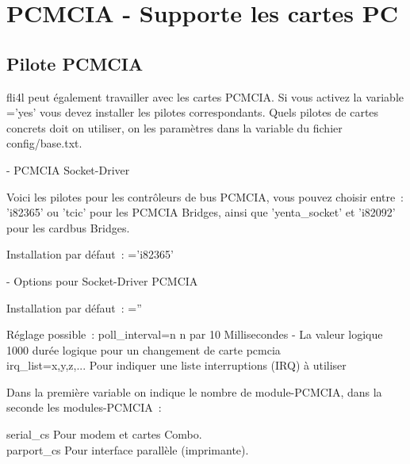 
{
\section {PCMCIA - Supporte les cartes PC}
}

           
\subsection{Pilote PCMCIA}

    fli4l peut également travailler avec les cartes PCMCIA. Si vous activez la variable
    ='yes' vous devez installer les pilotes correspondants. Quels
    pilotes de cartes concrets doit on utiliser, on les paramètres dans la variable
     du fichier config/base.txt.

\begin{description}
 - PCMCIA Socket-Driver

    Voici les pilotes pour les contrôleurs de bus PCMCIA, vous pouvez choisir entre~: 'i82365'
    ou 'tcic' pour les PCMCIA Bridges, ainsi que 'yenta\_socket' et 'i82092' pour les
    cardbus Bridges.

        Installation par défaut~: ='i82365'


 - Options pour Socket-Driver PCMCIA

        Installation par défaut~: =''

        Réglage possible~:
                poll\_interval=n        n par 10 Millisecondes - La valeur logique 1000
                                        durée logique pour un changement de carte pcmcia \\
                irq\_list=x,y,z,...     Pour indiquer une liste interruptions (IRQ) à utiliser



    Dans la première variable on indique le nombre de module-PCMCIA, dans 
    la seconde les modules-PCMCIA~:

    serial\_cs		Pour modem et cartes Combo. \\
    parport\_cs		Pour interface parallèle (imprimante). \\

\end{description}
